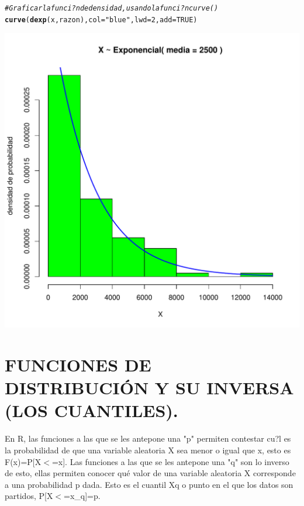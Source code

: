 \documentclass[12pt,letterpaper]{article}\usepackage[]{graphicx}\usepackage[]{color}
\makeatletter
\def\maxwidth{ %
  \ifdim\Gin@nat@width>\linewidth
    \linewidth
  \else
    \Gin@nat@width
  \fi
}
\newcommand{\hlnum}[1]{\textcolor[rgb]{0.686,0.059,0.569}{#1}}%
\newcommand{\hlstr}[1]{\textcolor[rgb]{0.192,0.494,0.8}{#1}}%
\newcommand{\hlcom}[1]{\textcolor[rgb]{0.678,0.584,0.686}{\textit{#1}}}%
\newcommand{\hlstd}[1]{\textcolor[rgb]{0.345,0.345,0.345}{#1}}%
\newcommand{\hlkwc}[1]{\textcolor[rgb]{0.333,0.667,0.333}{#1}}%
\newcommand{\hlkwd}[1]{\textcolor[rgb]{0.737,0.353,0.396}{\textbf{#1}}}%
\newenvironment{kframe}{%
 \def\at@end@of@kframe{}%
 \ifinner\ifhmode%
  \def\at@end@of@kframe{\end{minipage}}%
  \begin{minipage}{\columnwidth}%
 \fi\fi%
 \def\FrameCommand##1{\hskip\@totalleftmargin \hskip-\fboxsep
 \colorbox{shadecolor}{##1}\hskip-\fboxsep
     \hskip-\linewidth \hskip-\@totalleftmargin \hskip\columnwidth}%
 \MakeFramed {\advance\hsize-\width
   \@totalleftmargin\z@ \linewidth\hsize
   \@setminipage}}%
 {\par\unskip\endMakeFramed%
 \at@end@of@kframe}
\newenvironment{knitrout}{}{} %
\makeatother
\begin{document}
\begin{knitrout}
\begin{kframe}
\begin{alltt}
\hlcom{# Graficar la funci?n de densidad, usando la funci?n curve() }
\hlkwd{curve}\hlstd{(}\hlkwd{dexp}\hlstd{(x, razon),} \hlkwc{col}\hlstd{=}\hlstr{"blue"}\hlstd{,} \hlkwc{lwd}\hlstd{=}\hlnum{2}\hlstd{,} \hlkwc{add}\hlstd{=}\hlnum{TRUE}\hlstd{)}
\end{alltt}
\end{kframe}
\includegraphics[width=\maxwidth]{figure/unnamed-chunk-18-1} 

\end{knitrout}

\newpage


\section{FUNCIONES DE DISTRIBUCI\'ON Y SU INVERSA (LOS CUANTILES).}


En R, las funciones a las que se les antepone una "p" permiten contestar cu?l es la probabilidad de que una variable aleatoria X sea menor o igual que x, esto es F(x)=P[X$<$=x]. Las funciones a las que se les antepone una "q" son lo inverso de esto, ellas permiten conocer qu\'e valor de una variable aleatoria X corresponde a una probabilidad p dada. Esto es el cuantil Xq o punto en el que los datos son partidos, P[X$<$=x_q]=p.\\
\end{document}

